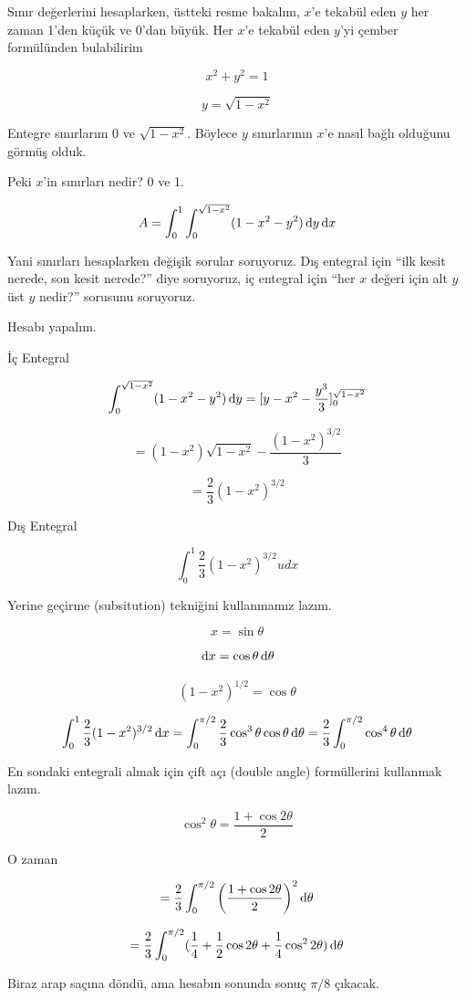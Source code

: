 \documentclass[12pt,fleqn]{article}\usepackage{../../common}
\begin{document}
Sınır değerlerini hesaplarken, üstteki resme bakalım, $x$'e tekabül eden $y$ her
zaman 1'den küçük ve 0'dan büyük. Her $x$'e tekabül eden $y$'yi çember
formülünden bulabilirim

$$ x^2 + y^2 =1 $$

$$ y = \sqrt{1-x^2} $$

Entegre sınırlarım 0 ve $\sqrt{1-x^2}$. Böylece $y$ sınırlarının $x$'e
nasıl bağlı olduğunu görmüş olduk. 

Peki $x$'in sınırları nedir? 0 ve 1. 

$$ A = \int_0^1 \int_0^{\sqrt{1-x^2}}  (1-x^2-y^2) \,\mathrm{d} y \,\mathrm{d} x $$

Yani sınırları hesaplarken değişik sorular soruyoruz. Dış entegral için ``ilk
kesit nerede, son kesit nerede?'' diye soruyoruz, iç entegral için ``her $x$
değeri için alt $y$ üst $y$ nedir?'' sorusunu soruyoruz.

Hesabı yapalım. 

İç Entegral 

$$
\int_0^{\sqrt{1-x^2}}  (1-x^2-y^2) \,\mathrm{d} y
= [ y - x^2 - \frac{y^3}{3} ]_0^{\sqrt{1-x^2}}
$$

$$ =  (1-x^2)\sqrt{1-x^2} - \frac{(1-x^2)^{3/2}}{3}$$

$$ = \frac{2}{3} (1-x^2)^{3/2} $$

Dış Entegral

$$ \int_0^1 \frac{2}{3} (1-x^2)^{3/2} ud x $$

Yerine geçirme (subsitution) tekniğini kullanmamız lazım. 

$$ x = \sin\theta $$

$$ \,\mathrm{d} x = \cos\theta \,\mathrm{d}\theta$$

$$ (1-x^2)^{1/2} = \cos\theta $$

$$ 
\int_0^1 \frac{2}{3} (1-x^2)^{3/2} \,\mathrm{d} x = 
\int_0^{\pi/2} \frac{2}{3} \cos^3\theta \cos\theta \,\mathrm{d} \theta = 
\frac{2}{3} \int_0^{\pi/2} \cos^4\theta \,\mathrm{d}\theta
$$

En sondaki entegrali almak için çift açı (double angle) formüllerini
kullanmak lazım. 

$$ \cos^2\theta = \frac{1 + \cos 2\theta}{2} $$

O zaman 

$$ = 
\frac{2}{3} \int_0^{\pi/2} 
\bigg( \frac{1 + \cos 2\theta}{2} \bigg)^2 \,\mathrm{d}\theta 
$$

$$
= \frac{2}{3} \int_0^{\pi/2} (
\frac{1}{4} +  \frac{1}{2}\cos2\theta + 
\frac{1}{4}\cos^22\theta) \,\mathrm{d}\theta
$$

Biraz arap saçına döndü, ama hesabın sonunda sonuç $\pi/8$ çıkacak. 
\end{document}

